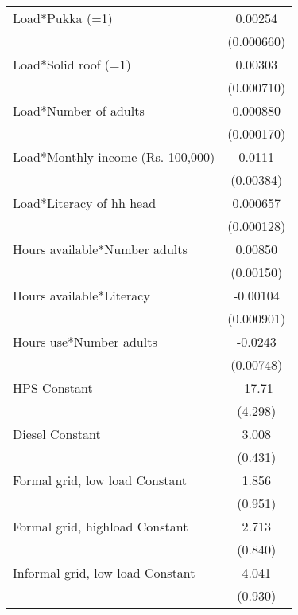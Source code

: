 \begin{table}[htbp]
{\begin{tabular}{l*{1}{c}}
\addlinespace
Load*Pukka (=1)     &     0.00254\sym{***}\\
                    &  (0.000660)         \\
\addlinespace
Load*Solid roof (=1)&     0.00303\sym{***}\\
                    &  (0.000710)         \\
\addlinespace
Load*Number of adults&    0.000880\sym{***}\\
                    &  (0.000170)         \\
\addlinespace
Load*Monthly income (Rs. 100,000)&      0.0111\sym{***}\\
                    &   (0.00384)         \\
\addlinespace
Load*Literacy of hh head&    0.000657\sym{***}\\
                    &  (0.000128)         \\
\addlinespace
Hours available*Number adults&     0.00850\sym{***}\\
                    &   (0.00150)         \\
\addlinespace
Hours available*Literacy&    -0.00104         \\
                    &  (0.000901)         \\
\addlinespace
Hours use*Number adults&     -0.0243\sym{***}\\
                    &   (0.00748)         \\
\midrule

HPS Constant            &      -17.71\sym{***}\\
                    &     (4.298)         \\
\midrule

Diesel Constant            &       3.008\sym{***}\\
                    &     (0.431)         \\
\midrule

Formal grid, low load Constant            &       1.856\sym{*}  \\
                    &     (0.951)         \\
\midrule

Formal grid, highload Constant            &       2.713\sym{***}\\
                    &     (0.840)         \\
\midrule

Informal grid, low load Constant            &       4.041\sym{***}\\
                    &     (0.930)         \\
\midrule


\end{tabular}}
\end{table}
